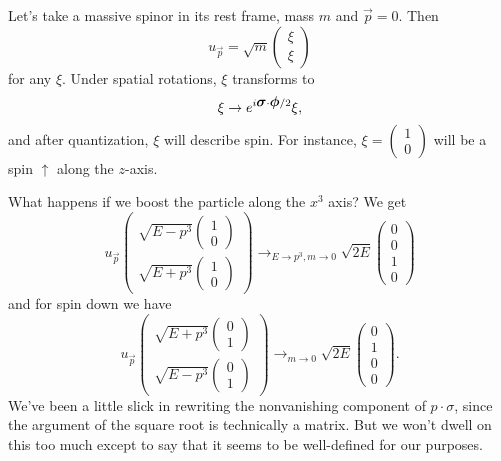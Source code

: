 \begin{exm}
Let's take a massive spinor in its rest frame, mass $m$ and $\vec p=0$. Then 
$$u_{\vec p}=\sqrt{m}\begin{pmatrix}\xi\\ \xi\end{pmatrix}$$
for any $\xi$. Under spatial rotations, $\xi$ transforms to
$$\xi \to e^{i\mbox{\boldmath$ \sigma $} \cdot \mbox{\boldmath$ \phi $}/2}\xi,$$
and after quantization, $\xi$ will describe spin. For instance, $\xi=\begin{pmatrix}1\\ 0\end{pmatrix}$ will be a spin $\uparrow$ along the $z$-axis.

What happens if we boost the particle along the $x^3$ axis? We get
$$u_{\vec p}\begin{pmatrix}\sqrt{E-p^3} \begin{pmatrix}1\\ 0\end{pmatrix}\\
\sqrt{E+p^3}\begin{pmatrix}1\\ 0\end{pmatrix}
\end{pmatrix}\to_{E\to p^3, m\to 0} \sqrt{2E} \begin{pmatrix}0\\0\\1\\0\end{pmatrix}$$
and for spin down we have
$$u_{\vec p}\begin{pmatrix}\sqrt{E+p^3} \begin{pmatrix}0\\ 1\end{pmatrix}\\
\sqrt{E-p^3}\begin{pmatrix}0\\ 1\end{pmatrix}
\end{pmatrix}\to_{m\to 0} \sqrt{2E} \begin{pmatrix}0\\1\\0\\0\end{pmatrix}.$$
We've been a little slick in rewriting the nonvanishing component of $p\cdot \sigma$, since the argument of the square root is technically a matrix. But we won't dwell on this too much except to say that it seems to be well-defined for our purposes.
\end{exm}

